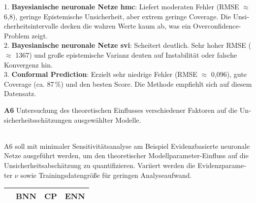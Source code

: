 \begin{otherlanguage}{ngerman}
1. \textbf{\gls{Bayesianische neuronale Netze} \gls{hmc}}: Liefert moderaten Fehler (RMSE $\approx$ 6{,}8), geringe \gls{Epistemische Unsicherheit}, aber extrem geringe Coverage. Die Unsicherheitsintervalle decken die wahren Werte kaum ab, was ein Overconfidence-Problem zeigt.\\
2. \textbf{\gls{Bayesianische neuronale Netze} \gls{svi}}: Scheitert deutlich. Sehr hoher RMSE ($\approx$ 1367) und große epistemische Varianz deuten auf Instabilität oder falsche Konvergenz hin.\\
3. \textbf{\gls{Conformal Prediction}}: Erzielt sehr niedrige Fehler (RMSE $\approx$ 0{,}096), gute Coverage (ca. 87\,\%) und den besten Score. Die Methode empfiehlt sich auf diesem Datensatz.



\pagebreak


\textbf{A6} Untersuchung des theoretischen Einflusses verschiedener Faktoren auf die Unsicherheitsschätzungen ausgewählter Modelle.
\par\noindent\\

A6 soll mit minimaler Sensitivitätsanalyse am Beispiel \gls{Evidenzbasierte neuronale Netze} ausgeführt werden, um den theoretischer Modellparameter-Einfluss auf die Unsicherheitsabschätzung zu quantifizieren. Variiert werden die Evidenzparameter $\nu$ sowie Trainingsdatengröße für geringen Analyseaufwand.



\begin{table}[!htpb]
  \centering
  \footnotesize
  \begin{tabularx}{\textwidth}{|l|X|X|X|}
    \hline
    & \textbf{BNN} & \textbf{CP} & \textbf{ENN} \\
    \hline


\end{tabularx}
\end{table}
\end{otherlanguage}

